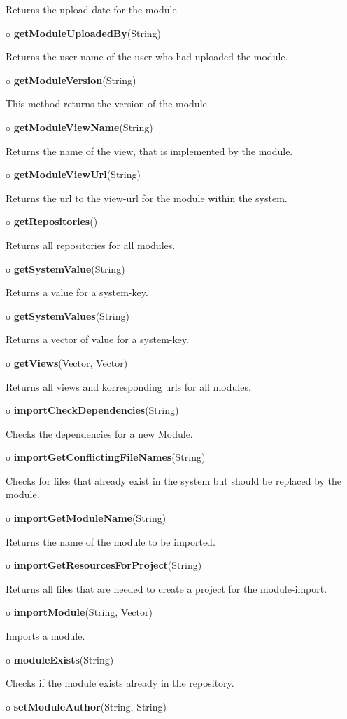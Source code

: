 \begin{description}
Returns the upload-date for the module.  
\item o {\bf getModuleUploadedBy}(String)  

Returns the user-name of the user who had uploaded the module.  
\item o {\bf getModuleVersion}(String)  

This method returns the version of the module.  
\item o {\bf getModuleViewName}(String)  

Returns the name of the view, that is implemented by the module.  
\item o {\bf getModuleViewUrl}(String)  

Returns the url to the view-url for the module within the system.  
\item o {\bf getRepositories}()  

Returns all repositories for all modules.  
\item o {\bf getSystemValue}(String)  

Returns a value for a system-key.  
\item o {\bf getSystemValues}(String)  

Returns a vector of value for a system-key.  
\item o {\bf getViews}(Vector, Vector)  

Returns all views and korresponding urls for all modules.  
\item o {\bf importCheckDependencies}(String)  

Checks the dependencies for a new Module.  
\item o {\bf importGetConflictingFileNames}(String)  

Checks for files that already exist in the system but should be replaced by
the module.  
\item o {\bf importGetModuleName}(String)  

Returns the name of the module to be imported.  
\item o {\bf importGetResourcesForProject}(String)  

Returns all files that are needed to create a project for the module-import.  
\item o {\bf importModule}(String, Vector)  

Imports a module.  
\item o {\bf moduleExists}(String)  

Checks if the module exists already in the repository.  
\item o {\bf setModuleAuthor}(String, String)  


\end{description}
